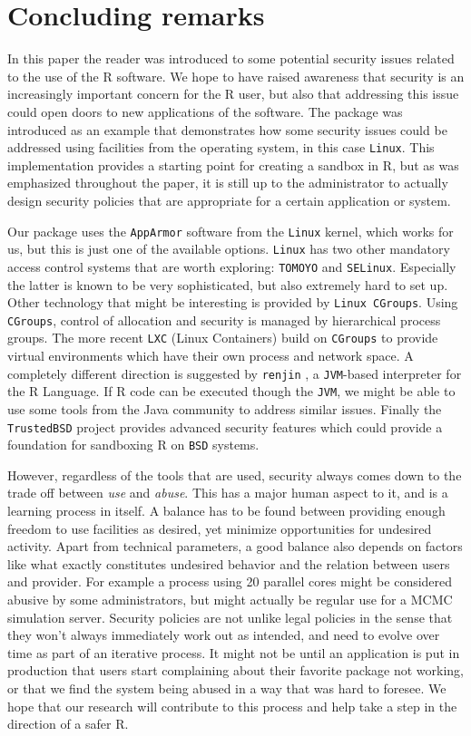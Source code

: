 \documentclass{jss}
\newcommand{\R}{\textsf{R}\xspace}
\newcommand{\Java}{\textsf{Java}\xspace}
\newcommand{\AppArmor}{\texttt{AppArmor}\xspace}
\newcommand{\RAppArmor}{\pkg{RAppArmor}\xspace}
\newcommand{\Linux}{\texttt{Linux}\xspace}
\begin{document}
\section{Concluding remarks}

In this paper the reader was introduced to some potential security issues
related to the use of the \R software. We hope to have raised awareness that
security is an increasingly important concern for the \R user, but also that
addressing this issue could open doors to new applications of the software. The
\RAppArmor package was introduced as an example that demonstrates how some
security issues could be addressed using facilities from the operating system,
in this case \Linux. This implementation provides a starting point for creating
a sandbox in \R, but as was emphasized throughout the paper, it is still up to
the administrator to actually design security policies that are appropriate for
a certain application or system.

Our package uses the \AppArmor software from the \Linux kernel, which works for
us, but this is just one of the available options. \Linux has two other
mandatory access control systems that are worth exploring: \texttt{TOMOYO} and
\texttt{SELinux}. Especially the latter is known to be very sophisticated, but
also extremely hard to set up. Other technology that might be interesting is
provided by \texttt{Linux CGroups}. Using \texttt{CGroups}, control of
allocation and security is managed by hierarchical process groups. The more
recent \texttt{LXC} (Linux Containers) build on \texttt{CGroups} to provide
virtual environments which have their own process and network space. A
completely different direction is suggested by \texttt{renjin} \citep{renjin},
a \texttt{JVM}-based interpreter for the R Language. If \R code can be executed
though the \texttt{JVM}, we might be able to use some tools from the \Java
community to address similar issues. Finally the \texttt{TrustedBSD} project
provides advanced security features which could provide a foundation for
sandboxing \R on \texttt{BSD} systems.

However, regardless of the tools that are used, security always comes down to
the trade off between \emph{use} and \emph{abuse}. This has a major human
aspect to it, and is a learning process in itself. A balance has to be found
between providing enough freedom to use facilities as desired, yet minimize
opportunities for undesired activity. Apart from technical parameters, a good
balance also depends on factors like what exactly constitutes undesired
behavior and the relation between users and provider. For example a process
using 20 parallel cores might be considered abusive by some administrators, but
might actually be regular use for a MCMC simulation server. Security policies
are not unlike legal policies in the sense that they won't always immediately
work out as intended, and need to evolve over time as part of an iterative
process. It might not be until an application is put in production that users
start complaining about their favorite package not working, or that we find the
system being abused in a way that was hard to foresee. We hope that our
research will contribute to this process and help take a step in the direction
of a safer \R.
\end{document}
